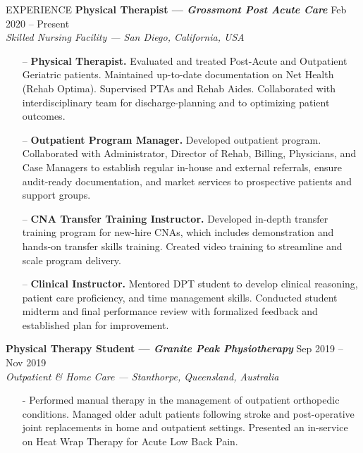\documentclass{resume} %
\begin{document}
\begin{rSection}{EXPERIENCE}
\textbf{Physical Therapist --- \textit{Grossmont Post Acute Care}} \hfill Feb 2020 -- Present\\
\textit{Skilled Nursing Facility --- San Diego, California, USA}
\vspace*{-0.2cm}\begin{itemize}
    \item[--] \textbf{Physical Therapist.} Evaluated and treated Post-Acute and Outpatient Geriatric patients. Maintained up-to-date documentation on Net Health (Rehab Optima). Supervised PTAs and Rehab Aides. Collaborated with interdisciplinary team for discharge-planning and to optimizing patient outcomes.
    \item[--] \textbf{Outpatient Program Manager.} Developed outpatient program. Collaborated with Administrator, Director of Rehab, Billing, Physicians, and Case Managers to establish regular in-house and external referrals, ensure audit-ready documentation, and market services to prospective patients and support groups.
    \item[--] \textbf{CNA Transfer Training Instructor.} Developed in-depth transfer training program for new-hire CNAs, which includes demonstration and hands-on transfer skills training. Created video training to streamline and scale program delivery.
    \item[--] \textbf{Clinical Instructor.} Mentored DPT student to develop clinical reasoning, patient care proficiency, and time management skills. Conducted student midterm and final performance review with formalized feedback and established plan for improvement.
\end{itemize}

\textbf{Physical Therapy Student --- \textit{Granite Peak Physiotherapy}} 
\hfill Sep 2019 -- Nov 2019\\
\textit{Outpatient \& Home Care --- Stanthorpe, Queensland, Australia}
\vspace*{-0.2cm}\begin{itemize}
    \item[-] Performed manual therapy in the management of outpatient orthopedic conditions. Managed older adult patients following stroke and post-operative joint replacements in home and outpatient settings. Presented an in-service on Heat Wrap Therapy for Acute Low Back Pain.
\end{itemize}


\end{rSection}
\end{document}
